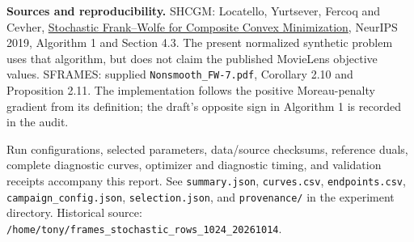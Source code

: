 \documentclass[10pt,a4paper]{article}
\begin{document}
\textbf{Sources and reproducibility.} SHCGM: Locatello, Yurtsever, Fercoq and Cevher, \href{https://proceedings.neurips.cc/paper/2019/file/bf40d1cbb2ba9fdad19821fc140fa50c-Paper.pdf}{Stochastic Frank--Wolfe for Composite Convex Minimization}, NeurIPS 2019, Algorithm 1 and Section 4.3. The present normalized synthetic problem uses that algorithm, but does not claim the published MovieLens objective values. SFRAMES: supplied \texttt{Nonsmooth\_FW-7.pdf}, Corollary 2.10 and Proposition 2.11. The implementation follows the positive Moreau-penalty gradient from its definition; the draft's opposite sign in Algorithm 1 is recorded in the audit.

Run configurations, selected parameters, data/source checksums, reference duals, complete diagnostic curves, optimizer and diagnostic timing, and validation receipts accompany this report. See \texttt{summary.json}, \texttt{curves.csv}, \texttt{endpoints.csv}, \texttt{campaign\_config.json}, \texttt{selection.json}, and \texttt{provenance/} in the experiment directory. Historical source: \texttt{/home/tony/frames\_stochastic\_rows\_1024\_20261014}.
\end{document}
